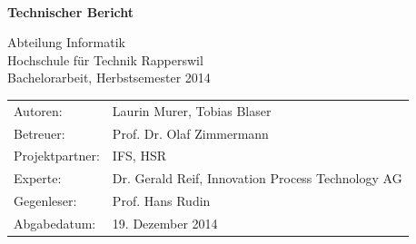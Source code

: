 \begin{titlepage}
\begin{center}
		{\fontsize{28}{35} \selectfont \textbf{\project} \\}
		\vspace{0.25cm}
		{\fontsize{22}{40} \selectfont \textbf{Technischer Bericht} \\[10mm]}
	
		{\fontsize{18}{20} \selectfont 
			Abteilung Informatik\\
			Hochschule für Technik Rapperswil \\
				
			{\fontsize{14}{16} \selectfont Bachelorarbeit, Herbstsemester 2014\\}
		}
		
	\end{center}
	
	\vspace*{1.5cm}
	\begin{minipage}[b]{0.4\textwidth}
		\begin{flushleft}
			\begin{tabular}{ll}  
				Autoren: & Laurin Murer, Tobias Blaser \\ 
				Betreuer: & Prof. Dr. Olaf Zimmermann\\ 
				Projektpartner: & IFS, HSR\\
				Experte: & Dr. Gerald Reif, Innovation Process Technology AG\\
				Gegenleser: & Prof. Hans Rudin\\
				Abgabedatum: & 19. Dezember 2014\\
			\end{tabular}
		\end{flushleft}
	\end{minipage}	

\end{titlepage}